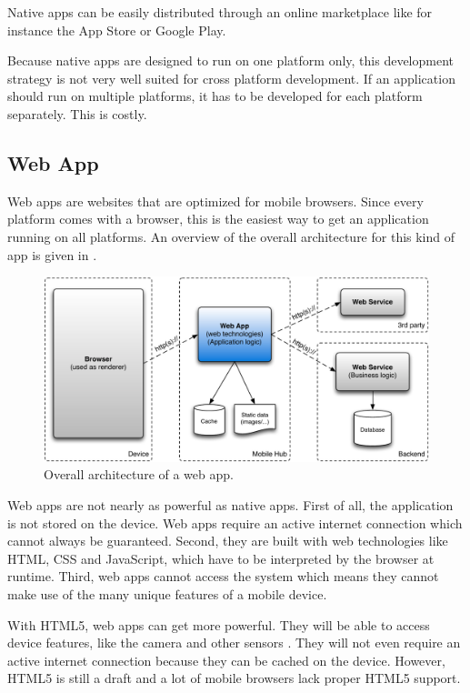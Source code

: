Native apps can be easily distributed through an online marketplace like for instance the App Store or Google Play. 

Because native apps are designed to run on one platform only, this development strategy is not very well suited for cross platform development. If an application should run on multiple platforms, it has to be developed for each platform separately. This is costly.

\subsection{Web App}

Web apps are websites that are optimized for mobile browsers. Since every platform comes with a browser, this is the easiest way to get an application running on all platforms. An overview of the overall architecture for this kind of app is given in .

\begin{figure}[h!]
    \begin{center}
        \includegraphics[width=\textwidth]{figs/web.pdf}
        \caption{
            Overall architecture of a web app.
        }
        \label{fig:web}
    \end{center}
\end{figure}

Web apps are not nearly as powerful as native apps. First of all, the application is not stored on the device. Web apps require an active internet connection which cannot always be guaranteed. Second, they are built with web technologies like HTML, CSS and JavaScript, which have to be interpreted by the browser at runtime. Third, web apps cannot access the system which means they cannot make use of the many unique features of a mobile device. 

With HTML5, web apps can get more powerful. They will be able to access device features, like the camera and other sensors \cite{MobileHTML5}. They will not even require an active internet connection because they can be cached on the device. However, HTML5 is still a draft and a lot of mobile browsers lack proper HTML5 support.

